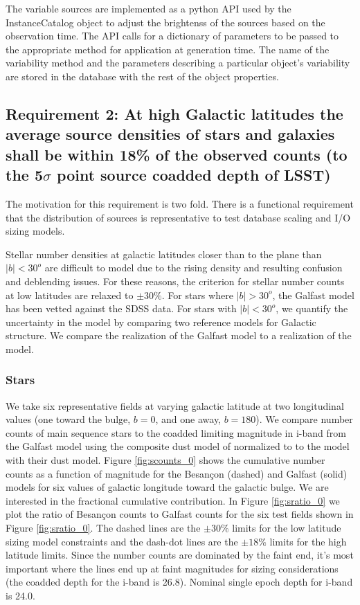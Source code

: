 \documentclass[]{article}
\begin{document}
{The variable sources are implemented as a python API used by the InstanceCatalog object to adjust the brightenss of the sources based on the observation time.
The API calls for a dictionary of parameters to be passed to the appropriate method for application at generation time.  The name of the variability method and
the parameters describing a particular object's variability are stored in the database with the rest of the object properties.

\subsection{Requirement 2: At high Galactic latitudes the average source densities of stars and galaxies
shall be within 18\% of the observed counts (to the 5$\sigma$ point source coadded depth of LSST)}
The motivation for this requirement is two fold.  There is a functional requirement that the distribution of sources is representative
to test database scaling and I/O sizing models.  

Stellar number densities at galactic latitudes closer than to the plane than $|b| < 30^o$ are difficult to model due to the rising density and resulting confusion and deblending issues.
For these reasons, the criterion for stellar number counts at low latitudes are relaxed to $\pm 30\%$. 
For stars where $|b| > 30^o$, the Galfast model has been vetted against the SDSS data.  For stars with $|b| < 30^o$, we quantify the uncertainty in the model by comparing two reference models for Galactic structure.
We compare the realization of the Galfast model to a realization of the \citet{besancon} model.

\subsubsection{Stars}
We take six representative fields at varying galactic latitude at two longitudinal values (one toward the bulge, $b=0$, and one away, $b=180$).  
We compare number 
counts of main sequence stars to the coadded limiting magnitude in i-band 
 from the Galfast model using the composite dust model
of \citet{amores05} normalized to \citet{schlegel98} to the \citet{besancon} model with their dust model.  Figure \ref{fig:scounts_0} shows 
the cumulative number counts as a function of magnitude for the Besan\c{c}on (dashed) and Galfast (solid) models 
for six values of galactic longitude toward the galactic bulge.  We are interested in the
fractional cumulative contribution.  In Figure \ref{fig:sratio_0} we plot the ratio of Besan\c{c}on counts to Galfast counts for the six test fields shown in Figure \ref{fig:sratio_0}.
The dashed lines are the $\pm30\%$ limits for the low latitude sizing model constraints and the dash-dot lines are the $\pm18\%$ limits for the high latitude limits.
Since the number counts are dominated by the faint end, it's most important where the lines end up at faint magnitudes for sizing considerations 
(the coadded depth for the i-band is 26.8).  
Nominal single epoch depth for i-band is 24.0.  

}
\end{document}
